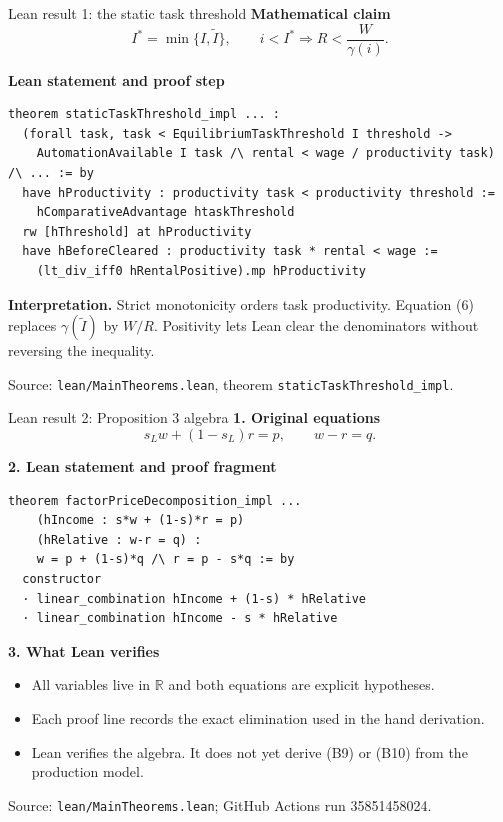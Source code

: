 \documentclass[aspectratio=169,11pt]{beamer}
\newcommand{\source}[1]{\vfill{\tiny\color{navy!70}Source: #1}}
\begin{document}
\begin{frame}[fragile]{Lean result 1: the static task threshold}
  \small
  \textbf{Mathematical claim}
  \[
    I^*=\min\{I,\widetilde I\},\qquad
    i<I^* \Rightarrow R<\frac{W}{\gamma(i)}.
  \]

  \textbf{Lean statement and proof step}
  \begin{lstlisting}[style=lean]
theorem staticTaskThreshold_impl ... :
  (forall task, task < EquilibriumTaskThreshold I threshold ->
    AutomationAvailable I task /\ rental < wage / productivity task) /\ ... := by
  have hProductivity : productivity task < productivity threshold :=
    hComparativeAdvantage htaskThreshold
  rw [hThreshold] at hProductivity
  have hBeforeCleared : productivity task * rental < wage :=
    (lt_div_iff0 hRentalPositive).mp hProductivity
  \end{lstlisting}

  \textbf{Interpretation.} Strict monotonicity orders task productivity. Equation
  (6) replaces $\gamma(\widetilde I)$ by $W/R$. Positivity lets Lean clear the
  denominators without reversing the inequality.

  \source{\texttt{lean/MainTheorems.lean}, theorem \texttt{staticTaskThreshold\_impl}.}
\end{frame}

\begin{frame}[fragile]{Lean result 2: Proposition 3 algebra}
  \small
  \textbf{1. Original equations}
  \[
    s_Lw+(1-s_L)r=p,\qquad w-r=q.
  \]

  \textbf{2. Lean statement and proof fragment}
  \begin{lstlisting}[style=lean]
theorem factorPriceDecomposition_impl ...
    (hIncome : s*w + (1-s)*r = p)
    (hRelative : w-r = q) :
    w = p + (1-s)*q /\ r = p - s*q := by
  constructor
  · linear_combination hIncome + (1-s) * hRelative
  · linear_combination hIncome - s * hRelative
  \end{lstlisting}

  \textbf{3. What Lean verifies}
  \begin{itemize}
    \item All variables live in $\mathbb{R}$ and both equations are explicit hypotheses.
    \item Each proof line records the exact elimination used in the hand derivation.
    \item Lean verifies the algebra. It does not yet derive (B9) or (B10) from the production model.
  \end{itemize}

  \source{\texttt{lean/MainTheorems.lean}; GitHub Actions run 35851458024.}
\end{frame}
\end{document}
